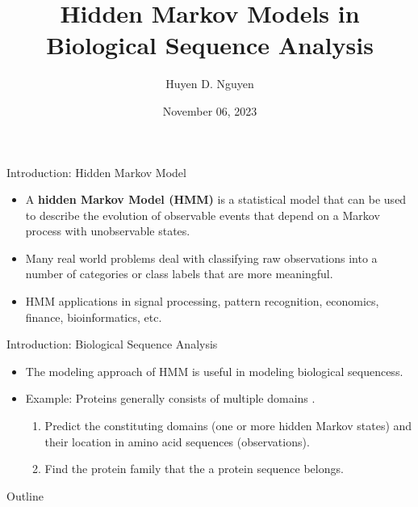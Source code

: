 \documentclass{beamer}
\title[University of Connecticut] {Hidden Markov Models in Biological Sequence Analysis}
\author{Huyen D. Nguyen}
\institute[]{University of Connecticut \\
	\medskip
	\text{Department of Statistics}\\
}
\date{November 06, 2023}
\begin{document}
\begin{frame}
	\titlepage
\end{frame}

\begin{frame}{Introduction: Hidden Markov Model}
	\begin{itemize}
		\item A \textbf{hidden Markov Model (HMM)} is a statistical model that can be used to describe the evolution of observable events that depend on a Markov process with unobservable states. 
		\item Many real world problems deal with classifying raw observations into a number of categories or class labels that are more meaningful.
		\item HMM applications in signal processing, pattern recognition, economics, finance, bioinformatics, etc.
	\end{itemize}
\end{frame}

\begin{frame}{Introduction: Biological Sequence Analysis}
	\begin{itemize}
		\item The modeling approach of HMM is useful in modeling biological sequencess.
		\item Example: Proteins generally consists of multiple domains \cite{yoon2009hidden}. 
		\begin{enumerate}
			\item Predict the constituting domains (one or more hidden Markov states) and their location in amino acid sequences (observations).
			\item Find the protein family that the a protein sequence belongs.
		\end{enumerate}
	\end{itemize}
\end{frame}

\begin{frame}{Outline}
	\tableofcontents
\end{frame}
\end{document}
